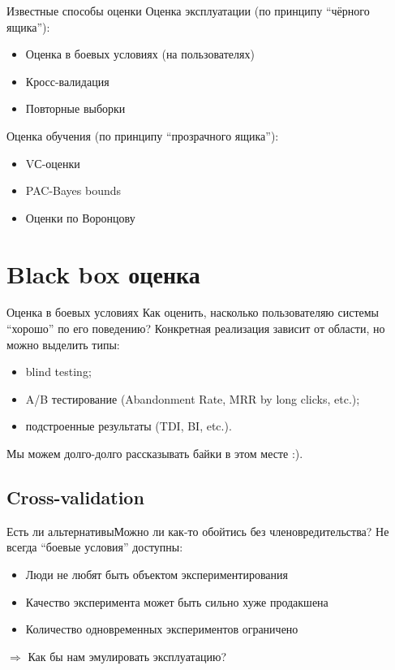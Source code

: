 \documentclass[14pt, fleqn, xcolor={dvipsnames, table}]{beamer}
\begin{document}
\begin{frame}{Известные способы оценки}
Оценка эксплуатации (по принципу ``чёрного ящика''):
\begin{itemize}
  \item Оценка в боевых условиях (на пользователях)
  \item Кросс-валидация
  \item Повторные выборки
\end{itemize}
Оценка обучения (по принципу ``прозрачного ящика''):
\begin{itemize}
  \item VС-оценки
  \item PAC-Bayes bounds
  \item Оценки по Воронцову
\end{itemize}
\end{frame}

\section{Black box оценка}
\begin{frame}{Оценка в боевых условиях}
Как оценить, насколько пользователяю системы ``хорошо'' по его поведению?
Конкретная реализация зависит от области, но можно выделить типы:
\begin{itemize}
\item blind testing;
\item A/B тестирование (Abandonment Rate, MRR by long clicks, etc.);
\item подстроенные результаты (TDI, BI, etc.).
\end{itemize}
\footnotesize Мы можем долго-долго рассказывать байки в этом месте :).
\end{frame}

\subsection{Cross-validation}
\begin{frame}{Есть ли альтернативы}{Можно ли как-то обойтись без членовредительства?}
Не всегда ``боевые условия'' доступны:
\begin{itemize}
\item Люди не любят быть объектом экспериментирования
\item Качество эксперимента может быть сильно хуже продакшена
\item Количество одновременных экспериментов ограничено
\end{itemize}
$\Rightarrow$ Как бы нам эмулировать эксплуатацию? \\
\end{frame}
\end{document}
